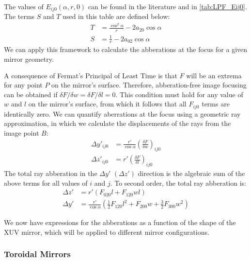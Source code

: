 The values of $E_{ij0}(\alpha, r, 0)$ can be found in the literature and in \cref{tab:LPF_Eij0}. The terms $S$ and $T$ used in this table are defined below:
\begin{align}
T &= \frac{\cos^2 \alpha}{r} - 2 a_{20} \cos \alpha \\
S &= \frac{1}{r} - 2 a_{02} \cos \alpha
\end{align}
We can apply this framework to calculate the abberations at the focus for a given mirror geometry.

A consequence of Fermat's Principal of Least Time is that $F$ will be an extrema for any point $P$ on the mirror's surface. Therefore, abberation-free image focusing can be obtained if $\delta F/\delta w = \delta F / \delta l = 0$. This condition must hold for any value of $w$ and $l$ on the mirror's surface, from which it follows that all $F_{ij0}$ terms are identically zero. We can quantify aberrations at the focus using a geometric ray approximation, in which we calculate the displacements of the rays from the image point $B$:
\begin{align}
\Delta y'_{ij0} &= \frac{r'}{\cos \alpha} \left( \frac{\delta F}{\delta w} \right)_{ij0} \\
\Delta z'_{ij0} &= r' \left( \frac{\delta F}{\delta l} \right)_{ij0}
\end{align}
The total ray abberation in the $\Delta y'$ $(\Delta z')$ direction is the algebraic sum of the above terms for all values of $i$ and $j$. To second order, the total ray abberation is:
\begin{align}
\Delta z' &= r' \left( F_{020} l + F_{120} w l \right) \\
\Delta y' &= \frac{r'}{\cos \alpha} \left( \frac{1}{2} F_{120} l^2 + F_{200} w + \frac{3}{2} F_{300} w^2 \right)
\label{eqn:abberation_expansion}
\end{align}

We now have expressions for the abberations as a function of the shape of the XUV mirror, which will be applied to different mirror configurations.

\subsubsection{Toroidal Mirrors}

